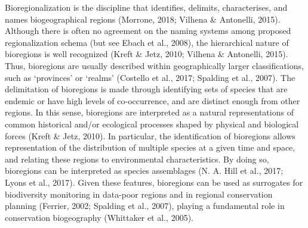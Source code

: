 \documentclass{article}
\begin{document}
Bioregionalization is the discipline that identifies, delimits, characterises, and names biogeographical regions (Morrone, 2018; Vilhena \& Antonelli, 2015). Although there is often no agreement on the naming systems among proposed regionalization schema (but see Ebach et al., 2008), the hierarchical nature of bioregions is well recognized (Kreft \& Jetz, 2010; Vilhena \& Antonelli, 2015). Thus, bioregions are usually described within geographically larger classifications, such as `provinces' or `realms' (Costello et al., 2017; Spalding et al., 2007). The delimitation of bioregions is made through identifying sets of species that are endemic or have high levels of co-occurrence, and are distinct enough from other regions. In this sense, bioregions are interpreted as a natural representations of common historical and/or ecological processes shaped by physical and biological forces (Kreft \& Jetz, 2010). In particular, the identification of bioregions allows representation of the distribution of multiple species at a given time and space, and relating these regions to environmental characteristics. By doing so, bioregions can be interpreted as species assemblages (N. A. Hill et al., 2017; Lyons et al., 2017). Given these features, bioregions can be used as surrogates for biodiversity monitoring in data-poor regions and in regional conservation planning (Ferrier, 2002; Spalding et al., 2007), playing a fundamental role in conservation biogeography (Whittaker et al., 2005).
\end{document}
